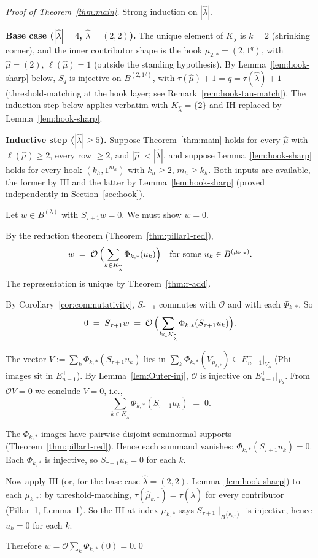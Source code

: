 \documentclass[11pt]{article}
\theoremstyle{definition}
\newcommand{\Vlam}{V_\lambda}
\newcommand{\Bdec}{B^{(\lambda)}}
\newcommand{\hatl}{\widehat\lambda}
\newcommand{\hatm}{\widehat\mu}
\newcommand{\Outer}{\mathcal{O}}
\begin{document}
\begin{proof}[Proof of Theorem~\ref{thm:main}]
Strong induction on $|\hatl|$.

\medskip\textbf{Base case ($|\hatl| = 4$, $\hatl = (2, 2)$).}
The unique element of $K_{\hatl}$ is $k = 2$ (shrinking corner), and
the inner contributor shape is the hook $\mu_{2,*} = (2, 1^q)$, with
$\hat\mu = (2)$, $\ell(\hat\mu) = 1$ (outside the standing hypothesis).
By Lemma~\ref{lem:hook-sharp} below, $S_{q}$ is injective on
$B^{(2, 1^q)}$, with $\tau(\hat\mu) + 1 = q = \tau(\hatl) + 1$
(threshold-matching at the hook layer; see
Remark~\ref{rem:hook-tau-match}). The induction step below applies
verbatim with $K_{\hatl} = \{2\}$ and IH replaced by
Lemma~\ref{lem:hook-sharp}.

\medskip\textbf{Inductive step ($|\hatl| \ge 5$).}
Suppose Theorem~\ref{thm:main} holds for every $\hatm$ with
$\ell(\hatm) \ge 2$, every row $\ge 2$, and $|\hatm| < |\hatl|$, and
suppose Lemma~\ref{lem:hook-sharp} holds for every hook $(k_h, 1^{m_h})$
with $k_h \ge 2$, $m_h \ge k_h$. Both inputs are available, the
former by IH and the latter by Lemma~\ref{lem:hook-sharp} (proved
independently in Section~\ref{sec:hook}).

Let $w \in \Bdec$ with $S_{\tau+1} w = 0$. We must show $w = 0$.

By the reduction theorem (Theorem~\ref{thm:pillar1-red}),
\[
   w \;=\; \Outer \,\Bigl(\sum_{k \in K_{\hatl}}
   \Phi_{k,*}(u_k)\Bigr)
   \quad \text{for some } u_k \in B^{(\mu_{k,*})}.
\]
The representation is unique by Theorem~\ref{thm:r-add}.

By Corollary~\ref{cor:commutativity}, $S_{\tau+1}$ commutes with
$\Outer$ and with each $\Phi_{k,*}$. So
\[
   0 \;=\; S_{\tau+1} w
   \;=\; \Outer\,\Bigl(\sum_{k \in K_{\hatl}}
   \Phi_{k,*}(S_{\tau+1} u_k)\Bigr).
\]

The vector $V := \sum_k \Phi_{k,*}(S_{\tau+1} u_k)$ lies in $\sum_k
\Phi_{k,*}(V_{\mu_{k,*}}) \subseteq E^+_{n-1}|_{\Vlam}$ (Phi-images sit
in $E^+_{n-1}$). By Lemma~\ref{lem:Outer-inj}, $\Outer$ is injective on
$E^+_{n-1}|_{\Vlam}$. From $\Outer V = 0$ we conclude $V = 0$, i.e.,
\[
   \sum_{k \in K_{\hatl}} \Phi_{k,*}(S_{\tau+1} u_k) \;=\; 0.
\]

The $\Phi_{k,*}$-images have pairwise disjoint seminormal supports
(Theorem~\ref{thm:pillar1-red}). Hence each summand vanishes:
$\Phi_{k,*}(S_{\tau+1} u_k) = 0$. Each $\Phi_{k,*}$ is injective, so
$S_{\tau+1} u_k = 0$ for each $k$.

Now apply IH (or, for the base case $\hatl = (2, 2)$,
Lemma~\ref{lem:hook-sharp}) to each $\mu_{k,*}$: by
threshold-matching, $\tau(\hat\mu_{k,*}) = \tau(\hatl)$ for every
contributor (Pillar~1, Lemma~1). So the IH at index $\mu_{k,*}$ says
$S_{\tau+1}\!\mid_{B^{(\mu_{k,*})}}$ is injective, hence $u_k = 0$ for
each $k$.

Therefore $w = \Outer\sum_k \Phi_{k,*}(0) = 0$.\qed
\end{proof}
\end{document}
